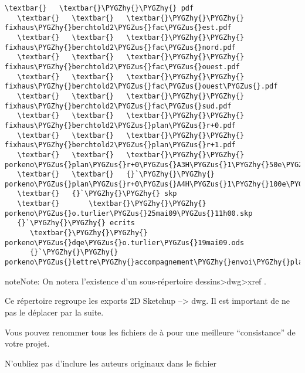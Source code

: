 \documentclass[a4paper,12pt,french]{sphinxmanual}
\def\PYGZus{\char`\_}
\def\PYGZhy{\char`\-}
\begin{document}
\begin{Verbatim}[commandchars=\\\{\}]
   \textbar{}   \textbar{}\PYGZhy{}\PYGZhy{} pdf
   \textbar{}   \textbar{}   \textbar{}\PYGZhy{}\PYGZhy{} fixhaus\PYGZhy{}berchtold2\PYGZus{}fac\PYGZus{}est.pdf
   \textbar{}   \textbar{}   \textbar{}\PYGZhy{}\PYGZhy{} fixhaus\PYGZhy{}berchtold2\PYGZus{}fac\PYGZus{}nord.pdf
   \textbar{}   \textbar{}   \textbar{}\PYGZhy{}\PYGZhy{} fixhaus\PYGZhy{}berchtold2\PYGZus{}fac\PYGZus{}ouest.pdf
   \textbar{}   \textbar{}   \textbar{}\PYGZhy{}\PYGZhy{} fixhaus\PYGZhy{}berchtold2\PYGZus{}fac\PYGZus{}ouest\PYGZus{}.pdf
   \textbar{}   \textbar{}   \textbar{}\PYGZhy{}\PYGZhy{} fixhaus\PYGZhy{}berchtold2\PYGZus{}fac\PYGZus{}sud.pdf
   \textbar{}   \textbar{}   \textbar{}\PYGZhy{}\PYGZhy{} fixhaus\PYGZhy{}berchtold2\PYGZus{}plan\PYGZus{}r+0.pdf
   \textbar{}   \textbar{}   \textbar{}\PYGZhy{}\PYGZhy{} fixhaus\PYGZhy{}berchtold2\PYGZus{}plan\PYGZus{}r+1.pdf
   \textbar{}   \textbar{}   \textbar{}\PYGZhy{}\PYGZhy{} porkeno\PYGZus{}plan\PYGZus{}r+0\PYGZus{}A3H\PYGZus{}1\PYGZhy{}50e\PYGZus{}o.turlier\PYGZus{}14mai09\PYGZus{}12h00.pdf
   \textbar{}   \textbar{}   {}`\PYGZhy{}\PYGZhy{} porkeno\PYGZus{}plan\PYGZus{}r+0\PYGZus{}A4H\PYGZus{}1\PYGZhy{}100e\PYGZus{}o.turlier\PYGZus{}14mai09\PYGZus{}12h00.pdf
   \textbar{}   {}`\PYGZhy{}\PYGZhy{} skp
   \textbar{}       \textbar{}\PYGZhy{}\PYGZhy{} porkeno\PYGZus{}o.turlier\PYGZus{}25mai09\PYGZus{}11h00.skp
   {}`\PYGZhy{}\PYGZhy{} ecrits
      \textbar{}\PYGZhy{}\PYGZhy{} porkeno\PYGZus{}dqe\PYGZus{}o.turlier\PYGZus{}19mai09.ods
      {}`\PYGZhy{}\PYGZhy{} porkeno\PYGZus{}lettre\PYGZhy{}accompagnement\PYGZhy{}envoi\PYGZhy{}plans\PYGZhy{}a3\PYGZus{}o.t\PYGZus{}19mai09.odt
\end{Verbatim}

\begin{notice}{note}{Note:}
On notera l'existence d'un sous-répertoire dessins\textgreater{}dwg\textgreater{}xref .

Ce répertoire regroupe les exports 2D Sketchup --\textgreater{} dwg. Il est important de ne pas le déplacer par la suite.

Vous pouvez renommer tous les fichiers de  à  pour une meilleure ``consistance'' de votre projet.

N'oubliez pas d'inclure les auteurs originaux dans le fichier 
\end{notice}
\end{document}

